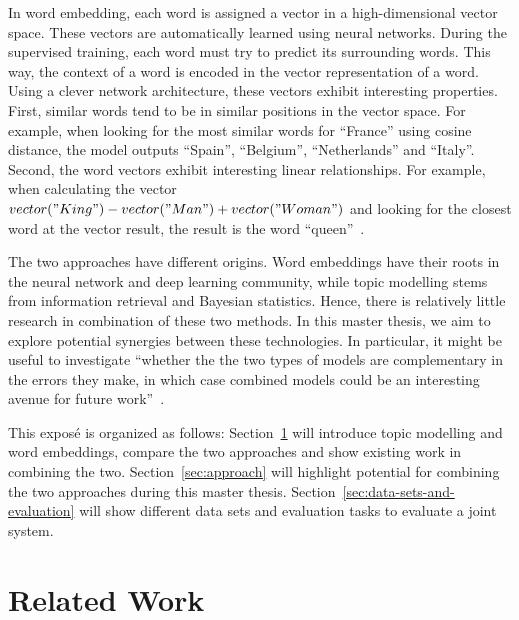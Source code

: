 \documentclass{sig-alternate-05-2015}
\begin{document}
In word embedding, each word is assigned a vector in a high-dimensional vector space.
These vectors are automatically learned using neural networks.
During the supervised training, each word must try to predict its surrounding words.
This way, the context of a word is encoded in the vector representation of a word.
Using a clever network architecture, these vectors exhibit interesting properties.
First, similar words tend to be in similar positions in the vector space.
For example, when looking for the most similar words for ``France'' using cosine distance, the model outputs ``Spain'', ``Belgium'', ``Netherlands'' and ``Italy''.
Second, the word vectors exhibit interesting linear relationships.
For example, when calculating the vector $vector("King") - vector("Man") + vector("Woman")$ and looking for the closest word at the vector result, the result is the word ``queen''~\cite{Mikolov2013b}.

The two approaches have different origins.
Word embeddings have their roots in the neural network and deep learning community, while topic modelling stems from information retrieval and Bayesian statistics.
Hence, there is relatively little research in combination of these two methods.
In this master thesis, we aim to explore potential synergies between these technologies.
In particular, it might be useful to investigate ``whether the the two types of models are complementary in the errors they make, in which case combined models could be an interesting avenue for future work''~\cite{Baroni2014}.

This expos\'e is organized as follows: Section~\ref{sec:related-work} will introduce topic modelling and word embeddings, compare the two approaches and show existing work in combining the two.
Section~\ref{sec:approach} will highlight potential for combining the two approaches during this master thesis.
Section~\ref{sec:data-sets-and-evaluation} will show different data sets and evaluation tasks to evaluate a joint system.

\section{Related Work}
\label{sec:related-work}
\end{document}
